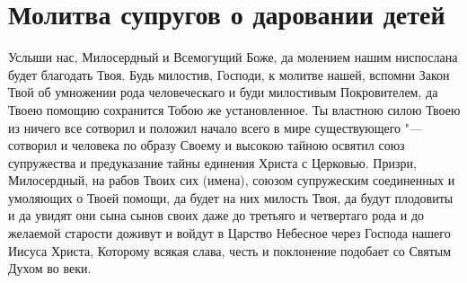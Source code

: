 \section{Молитва супругов о даровании детей}\begin{mymulticols}



Услыши нас, Милосердный и Всемогущий Боже, да молением нашим ниспослана будет благодать Твоя. Будь милостив, Господи, к молитве нашей, вспомни Закон Твой об умножении рода человеческаго и буди милостивым Покровителем, да Твоею помощию сохранится Тобою же установленное. Ты властною силою Твоею из ничего все сотворил и положил начало всего в мире существующего "--- сотворил и человека по образу Своему и высокою тайною освятил союз супружества и предуказание тайны единения Христа с Церковью. Призри, Милосердный, на рабов Твоих сих (имена), союзом супружеским соединенных и умоляющих о Твоей помощи, да будет на них милость Твоя, да будут плодовиты и да увидят они сына сынов своих даже до третьяго и четвертаго рода и до желаемой старости доживут и войдут в Царство Небесное через Господа нашего Иисуса Христа, Которому всякая слава, честь и поклонение подобает со Святым Духом во веки.


\end{mymulticols}

